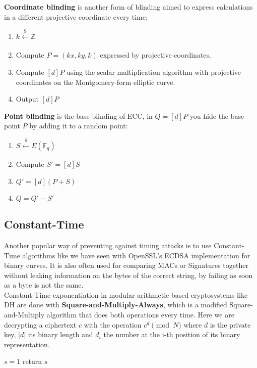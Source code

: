 \documentclass[a4paper,11pt]{article}
\begin{document}
\textbf{Coordinate blinding} is another form of blinding aimed to express calculations in a different projective coordinate every time:

\begin{enumerate}
\item{$k \xleftarrow[]{\$} \mathbb{Z}$}
\item{Compute $P = (kx, ky, k)$ expressed by projective coordinates.}
\item{Compute $[d]P$ using the scalar multiplication algorithm with projective coordinates on the Montgomery-form elliptic curve.}
\item{Output $[d]P$}
\end{enumerate}

\textbf{Point blinding} is the base blinding of ECC, in $Q = [d]P$ you hide the base point $P$ by adding it to a random point:

\begin{enumerate}
\item{$S \xleftarrow[]{\$} E(\mathbb{F}_q)$}
\item{Compute $S' = [d]S$}
\item{$Q' = [d](P + S)$}
\item{$Q = Q' - S'$}
\end{enumerate}

\subsection{Constant-Time}

Another popular way of preventing against timing attacks is to use Constant-Time algorithms like we have seen with OpenSSL's ECDSA implementation for binary curves. It is also often used for comparing MACs or Signatures together without leaking information on the bytes of the correct string, by failing as soon as a byte is not the same.\\

Constant-Time exponentiation in modular arithmetic based cryptosystems like DH are done with \textbf{Square-and-Multiply-Always}, which is a modified Square-and-Multiply algorithm that does both operations every time. Here we are decrypting a ciphertext $c$ with the operation $c^d \pmod{N}$ where $d$ is the private key, $|d|$ its binary length and $d_i$ the number at the i-th position of its binary representation.

\DontPrintSemicolon
\begin{algorithm}[H]
    $s = 1$\;
    return $s$\;
\end{algorithm}
\end{document}
